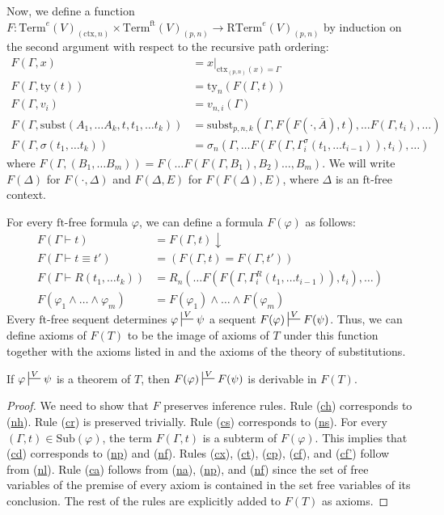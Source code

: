\documentclass[reqno]{amsart}
\newcommand{\axref}[1]{(\hyperref[ax:#1]{#1})}
\theoremstyle{definition}
\theoremstyle{remark}
\newcommand{\fs}[1]{\mathrm{#1}}
\newcommand{\Term}{\fs{Term}}
\newcommand{\RTerm}{\fs{RTerm}}
\newcommand{\subst}{\fs{subst}}
\newcommand{\ft}{\fs{ft}}
\newcommand{\ty}{\fs{ty}}
\newcommand{\ctx}{\fs{ctx}}
\newcommand{\sub}{\fs{Sub}}
\numberwithin{figure}{section}
\begin{document}
Now, we define a function $F : \Term^e(V)_{(\ctx,n)} \times \Term^\ft(V)_{(p,n)} \to \RTerm^e(V)_{(p,n)}$ by induction on the second argument with respect to the recursive path ordering:
\begin{align*}
F(\Gamma, x) & = x|_{\ctx_{(p,n)}(x) = \Gamma} \\
F(\Gamma, \ty(t)) & = \ty_n(F(\Gamma, t)) \\
F(\Gamma, v_i) & = v_{n,i}(\Gamma) \\
F(\Gamma, \subst(A_1, \ldots A_k, t, t_1, \ldots t_k)) & = \subst_{p,n,k}(\Gamma, F(F(\cdot,\overline{A}), t), \ldots F(\Gamma, t_i), \ldots) \\
F(\Gamma, \sigma(t_1, \ldots t_k)) & = \sigma_n(\Gamma, \ldots F(F(\Gamma, \Gamma^\sigma_i(t_1, \ldots t_{i-1})), t_i), \ldots)
\end{align*}
where $F(\Gamma, (B_1, \ldots B_m)) = F(\ldots F(F(\Gamma, B_1), B_2) \ldots, B_m)$.
We will write $F(\Delta)$ for $F(\cdot,\Delta)$ and $F(\Delta,E)$ for $F(F(\Delta),E)$, where $\Delta$ is an $\ft$-free context.

For every $\ft$-free formula $\varphi$, we can define a formula $F(\varphi)$ as follows:
\begin{align*}
F(\Gamma \vdash t) & = F(\Gamma,t)\!\downarrow \\
F(\Gamma \vdash t \equiv t') & = (F(\Gamma,t) = F(\Gamma,t')) \\
F(\Gamma \vdash R(t_1, \ldots t_k)) & = R_n(\ldots F(F(\Gamma, \Gamma^R_i(t_1, \ldots t_{i-1})), t_i), \ldots) \\
F(\varphi_1 \land \ldots \land \varphi_m) & = F(\varphi_1) \land \ldots \land F(\varphi_m)
\end{align*}
Every $\ft$-free sequent determines $\varphi \sststile{}{V} \psi$ a sequent $F(\varphi) \sststile{}{V} F(\psi)$.
Thus, we can define axioms of $F(T)$ to be the image of axioms of $T$ under this function together with the axioms listed in  and the axioms of the theory of substitutions.

\begin{lem}[ftmap-th]
If $\varphi \sststile{}{V} \psi$ is a theorem of $T$, then $F(\varphi) \sststile{}{V} F(\psi)$ is derivable in $F(T)$.
\end{lem}
\begin{proof}
We need to show that $F$ preserves inference rules.
Rule \axref{ch} corresponds to \axref{nh}.
Rule \axref{cr} is preserved trivially.
Rule \axref{cs} corresponds to \axref{ns}.
For every $(\Gamma,t) \in \sub(\varphi)$, the term $F(\Gamma,t)$ is a subterm of $F(\varphi)$.
This implies that \axref{cd} corresponds to \axref{np} and \axref{nf}.
Rules \axref{cx}, \axref{ct}, \axref{cp}, \axref{cf}, and \axref{cf'} follow from \axref{nl}.
Rule \axref{ca} follows from \axref{na}, \axref{np}, and \axref{nf} since the set of free variables of the premise of every axiom is contained in the set free variables of its conclusion.
The rest of the rules are explicitly added to $F(T)$ as axioms.
\end{proof}
\end{document}
